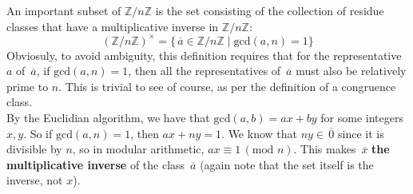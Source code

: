 \documentclass[12pt]{article}
\newcommand{\Z}{\mathbb{Z}}
\newcommand{\olsi}[1]{\,\overline{\!{#1}}}
\begin{document}
    An important subset of $\Z/n\Z$
    is the set consisting of the collection of residue classes
    that have a multiplicative inverse in $\Z/n\Z$:
    \[ (\Z/n\Z)^\times
    = \{ \olsi{a} \in \Z/n\Z \mid \text{gcd}(a, n) = 1 \} \]
    Obviosuly, to avoid ambiguity,
    this definition requires that for the representative $a$ of $\olsi{a}$,
    if $\text{gcd}(a, n) = 1$,
    then all the representatives of $\olsi{a}$ must
    also be relatively prime to $n$.
    This is trivial to see of course, as per the definition of
    a congruence class. \\
    By the Euclidian algorithm,
    we have that $\text{gcd}(a, b) = ax + by$ for some integers $x, y$.
    So if $\text{gcd}(a, n) = 1$,
    then $ax + ny = 1$.
    We know that $ny \in \olsi{0}$ since it is divisible by $n$,
    so in modular arithmetic, $ax \equiv 1 \, (\text{mod } n)$.
    This makes $\olsi{x}$
    \textbf{the multiplicative inverse} of the class $\olsi{a}$
    (again note that the set itself is the inverse, not $x$). \\
    
\end{document}
